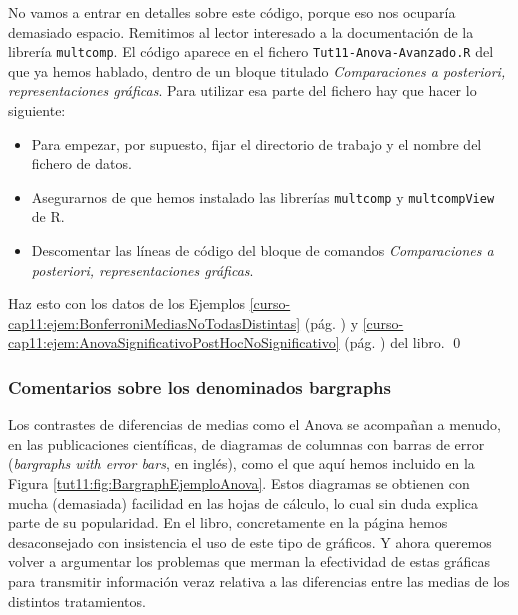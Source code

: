 \documentclass[10pt,a4paper]{article}\usepackage[]{graphicx}\usepackage[]{color}
\newcounter {cont01}
\begin{document}
No vamos a entrar en detalles sobre este código, porque eso nos ocuparía demasiado espacio. Remitimos al lector interesado a la documentación de la librería {\tt multcomp}. El código aparece en el fichero {\tt Tut11-Anova-Avanzado.R} del que ya hemos hablado, dentro de un bloque titulado {\em Comparaciones a posteriori, representaciones gráficas}. Para utilizar esa parte del fichero hay que hacer lo siguiente:

\begin{itemize}
  \item Para empezar, por supuesto, fijar el directorio de trabajo y el nombre del fichero de datos.
  \item Asegurarnos de que hemos instalado las librerías {\tt multcomp} y {\tt multcompView} de R.
  \item Descomentar las líneas de código del bloque de comandos {\em Comparaciones a posteriori, representaciones gráficas}.
\end{itemize}

\begin{ejercicio}
\label{tut11:ejercicio06}
Haz esto con los datos de los Ejemplos \ref{curso-cap11:ejem:BonferroniMediasNoTodasDistintas} (pág. \pageref{curso-cap11:ejem:BonferroniMediasNoTodasDistintas}) y \ref{curso-cap11:ejem:AnovaSignificativoPostHocNoSignificativo} (pág. \pageref{curso-cap11:ejem:AnovaSignificativoPostHocNoSignificativo}) del libro.
\qed
\end{ejercicio}

\subsubsection*{Comentarios sobre los denominados {\sf bargraphs}}

Los contrastes de diferencias de medias como el Anova se acompañan a menudo, en las publicaciones científicas, de diagramas de columnas con barras de error ({\em bargraphs with error bars}, en inglés), como el que aquí hemos incluido en la Figura \ref{tut11:fig:BargraphEjemploAnova}. Estos diagramas se obtienen con mucha (demasiada) facilidad en las hojas de cálculo, lo cual sin duda explica parte de su popularidad. En el libro, concretamente en la página \pageref{curso-cap09:fig:GraficoBarrasError} hemos desaconsejado con insistencia el uso de este tipo de gráficos. Y ahora queremos volver a argumentar los problemas que merman la efectividad de estas gráficas para transmitir información veraz relativa a las diferencias entre las medias de los distintos tratamientos.
\end{document}
